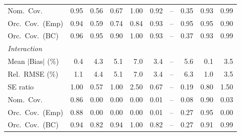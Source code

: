 \begin{table}[!htbp]
{\begin{tabular}{lrrrrrrrrr}
\quad Nom.\ Cov. & \cellcolor{rankone}0.95 & 0.56 & 0.67 & 1.00 & \cellcolor{rankthree}0.92 & -- & 0.35 & \cellcolor{ranktwo}0.93 & 0.99 \\
\quad Orc.\ Cov.\ (Emp) & \cellcolor{ranktwo}0.94 & 0.59 & 0.74 & 0.84 & \cellcolor{rankthree}0.93 & -- & \cellcolor{rankone}0.95 & \cellcolor{rankone}0.95 & 0.90 \\
\quad Orc.\ Cov.\ (BC) & \cellcolor{ranktwo}0.96 & \cellcolor{rankone}0.95 & 0.90 & 1.00 & \cellcolor{rankthree}0.93 & -- & 0.37 & \cellcolor{rankthree}0.93 & 0.99 \\
\midrule
\multicolumn{10}{l}{\textit{Interaction}} \\[2pt]
\quad Mean $|$Bias$|$ (\%) & \cellcolor{ranktwo}0.4 & 4.3 & 5.1 & 7.0 & \cellcolor{rankthree}3.4 & -- & 5.6 & \cellcolor{rankone}0.1 & 3.5 \\
\quad Rel.\ RMSE (\%) & \cellcolor{ranktwo}1.1 & 4.4 & 5.1 & 7.0 & \cellcolor{rankthree}3.4 & -- & 6.3 & \cellcolor{rankone}1.0 & 3.5 \\
\quad SE ratio & \cellcolor{rankone}1.00 & 0.57 & \cellcolor{rankone}1.00 & 2.50 & \cellcolor{rankthree}0.67 & -- & 0.19 & \cellcolor{ranktwo}0.80 & 1.50 \\
\quad Nom.\ Cov. & \cellcolor{ranktwo}0.86 & 0.00 & 0.00 & 0.00 & 0.01 & -- & \cellcolor{rankthree}0.08 & \cellcolor{rankone}0.90 & 0.03 \\
\quad Orc.\ Cov.\ (Emp) & \cellcolor{ranktwo}0.88 & 0.00 & 0.00 & 0.00 & 0.01 & -- & \cellcolor{rankthree}0.27 & \cellcolor{rankone}0.95 & 0.00 \\
\quad Orc.\ Cov.\ (BC) & \cellcolor{rankone}0.94 & 0.82 & \cellcolor{rankone}0.94 & \cellcolor{rankthree}1.00 & 0.82 & -- & 0.27 & \cellcolor{ranktwo}0.91 & \cellcolor{ranktwo}0.99 \\
\bottomrule
\end{tabular}}
\end{table}
